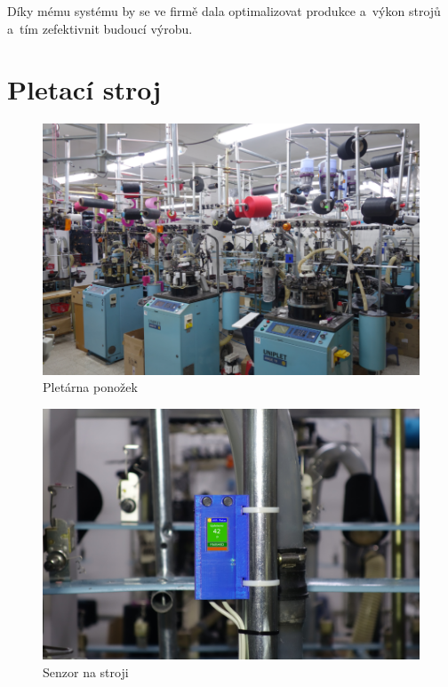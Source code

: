 Díky mému systému by se ve firmě dala optimalizovat produkce a~výkon strojů a~tím zefektivnit budoucí výrobu. 



\section{Pletací stroj}



\begin{figure}[htbp]
    \centering
    \includegraphics[width=\textwidth]{img/pletarna.png}
    \caption{Pletárna ponožek}
    \label{fig:Pletarna}
\end{figure}

\begin{figure}[htbp]
    \centering
    \includegraphics[width=\textwidth]{img/V2-uchyceni.png}
    \caption{Senzor na stroji}
    \label{fig:SenzorNaStroji}
\end{figure}


\newpage